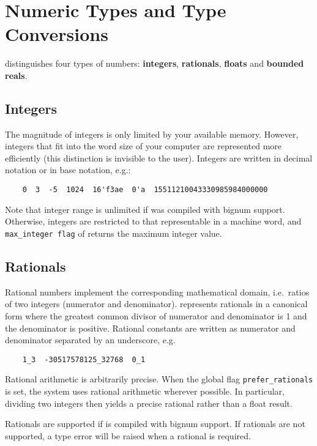 \section{Numeric Types and Type Conversions}
{\eclipse} distinguishes four types of numbers: {\bf integers},
{\bf rationals}, {\bf floats} and {\bf bounded reals}.

\subsection{Integers}
\label{intrep}
The magnitude of integers is only limited by your available 
memory. However, integers that fit into the word size of your computer are
represented more efficiently (this distinction is invisible to the user).
Integers are written in decimal notation or in base notation, e.g.:
\begin{verbatim}
	0  3  -5  1024  16'f3ae  0'a  15511210043330985984000000
\end{verbatim}

Note that integer range is unlimited if {\eclipse} was compiled with
bignum support. Otherwise, integers are restricted to that representable
in a machine word, and  {\tt max_integer flag} of  
returns the maximum integer value. 

\subsection{Rationals}
Rational numbers implement the corresponding mathematical domain,
i.e.\ ratios of two integers (numerator and denominator).
{\eclipse} represents rationals in a canonical form where the 
greatest common divisor of numerator and denominator is 1 and the
denominator is positive. Rational constants are written as numerator
and denominator separated by an underscore, e.g.
\begin{verbatim}
	1_3  -30517578125_32768  0_1
\end{verbatim}
Rational arithmetic is arbitrarily precise. When the global flag
{\tt prefer_rationals} is set, the system uses rational arithmetic
wherever possible. In particular, dividing two integers then yields a precise
rational rather than a float result.

Rationals are supported if {\eclipse} is compiled with bignum support. 
If rationals are not supported, a type error will be raised when a rational is 
required.

